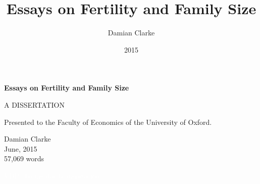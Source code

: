 \documentclass{report}[12pt]
\title{\textbf{Essays on Fertility and Family Size}}
\author{Damian Clarke}
\date{2015}
\begin{document}

\vspace*{\fill}
\vspace{-5cm}
\begin{center}
{\LARGE \textbf{Essays on Fertility and Family Size}}
\end{center}
\vspace*{\fill}

\newpage
\begin{center}
A DISSERTATION \\ \vspace{1cm}

Presented to the Faculty of Economics of the University of Oxford.

\vspace{17cm}
Damian Clarke \\ \vspace{1mm}
June, 2015    \\ \vspace{1mm}
57,069 words
\end{center}



\newpage
\begin{spacing}{1.4}
\begin{center}
\pagestyle{empty}
\textcolor{white}{VBP: T\'u me das la inspiraci\'on}\\
\vspace{5cm}
\end{center}
\end{spacing}
\newpage

\begin{spacing}{1.3}
\setlength\parindent{0.25in}
\setlength\parskip{0.25in}
\begin{abstract}

\end{abstract}
\end{spacing}

\newpage
\tableofcontents
{}
\end{document}
